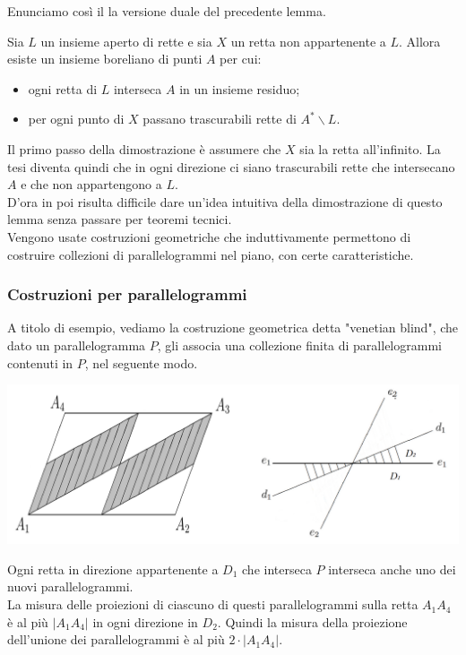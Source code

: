 \documentclass[11pt]{beamer} %
\newcommand{\<}{\langle}
\renewcommand{\>}{\rangle}
\theoremstyle{theorem}
\theoremstyle{theorem}
\theoremstyle{theorem}
\theoremstyle{theorem}
\theoremstyle{theorem}
\begin{document}
\begin{frame}
	Enunciamo così il la versione duale del precedente lemma.
	
	\begin{lemma}[2]
	Sia $L$ un insieme aperto di rette e sia $X$ un retta non appartenente a $L$. Allora esiste un insieme boreliano di punti $A$ per cui:\\
	\begin{itemize}
		\item ogni retta di $L$ interseca $A$ in un insieme residuo;\\
		\item per ogni punto di $X$ passano trascurabili rette di $A^{*} \backslash L$.\\
	\end{itemize}

	\medskip
	
	\end{lemma}
	\pause
	Il primo passo della dimostrazione è assumere che $X$ sia la retta all'infinito. La tesi diventa quindi che in ogni direzione ci siano trascurabili rette che intersecano $A$ e che non appartengono a $L$.\\
	\pause
	D'ora in poi risulta difficile dare un'idea intuitiva della dimostrazione di questo lemma senza passare per teoremi tecnici.\\
	\pause
	Vengono usate costruzioni geometriche che induttivamente permettono di costruire collezioni di parallelogrammi nel piano, con certe caratteristiche.\\
\end{frame}	



\begin{frame}[fragile]
	\frametitle{Costruzioni per parallelogrammi}
		A titolo di esempio, vediamo la costruzione geometrica detta "venetian blind", che dato un parallelogramma $P$, gli associa una collezione finita di parallelogrammi contenuti in $P$, nel seguente modo.
	\pause
	\begin{center}
		\includegraphics[width=0.9\columnwidth]{prova1.png}
	\end{center}
	\pause
	Ogni retta in direzione appartenente a $D_1$ che interseca $P$ interseca anche uno dei nuovi parallelogrammi.\\
	\pause
	La misura delle proiezioni di ciascuno di questi parallelogrammi sulla retta $A_{1} A_{4}$ è al più $\left|A_{1} A_{4}\right|$ in ogni direzione in $D_2$. \pause Quindi la misura della proiezione dell'unione dei parallelogrammi è al più $2 \cdot\left|A_{1} A_{4}\right|$.\\
\end{frame}
\end{document}
